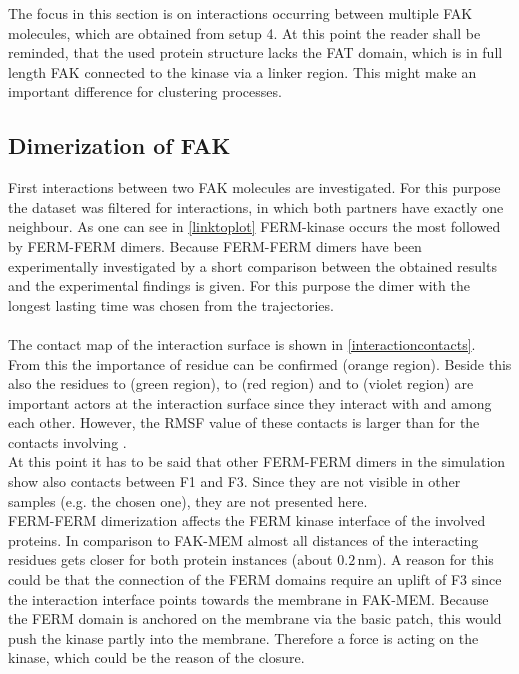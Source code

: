 The focus in this section is on interactions occurring between multiple FAK molecules, which are obtained from setup 4. At this point the reader shall be reminded, that the used protein structure lacks the FAT domain, which is in full length FAK connected to the kinase via a linker region. This might make an important difference for clustering processes.
\subsection{Dimerization of FAK}
\label{mult:dimers}
First interactions between two FAK molecules are investigated. For this purpose the dataset was filtered for interactions, in which both partners have exactly one neighbour. As one can see in \autoref{linktoplot} FERM-kinase occurs the most followed by FERM-FERM dimers. Because FERM-FERM dimers have been experimentally investigated by \textcite{fakdimers} a short comparison between the obtained results and the experimental findings is given. For this purpose the dimer with the longest lasting time was chosen from the trajectories.\\ 
\\
The contact map of the interaction surface is shown in \autoref{interactioncontacts}. From this the importance of residue  can be confirmed (orange region). Beside this also the residues  to  (green region),  to  (red region) and  to  (violet region) are important actors at the interaction surface since they interact with  and among each other. However, the RMSF value of these contacts is larger than for the contacts involving .\\
At this point it has to be said that other FERM-FERM dimers in the simulation show also contacts between F1 and F3. Since they are not visible in other samples (e.g. the chosen one), they are not presented here.\\ 
FERM-FERM dimerization affects the FERM kinase interface of the involved proteins. In comparison to FAK-MEM almost all distances of the interacting residues gets closer for both protein instances (about $0.2\,\si{\nano\metre}$). A reason for this could be that the connection of the FERM domains require an uplift of F3 since the interaction interface points towards the membrane in FAK-MEM. Because the FERM domain is anchored on the membrane via the basic patch, this would push the kinase partly into the membrane. Therefore a force is acting on the kinase, which could be the reason of the closure. %
